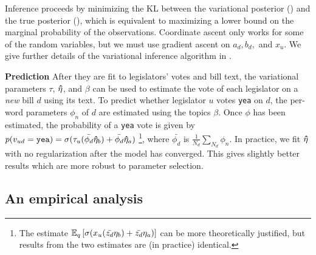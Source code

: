 Inference proceeds by minimizing the KL between the variational
posterior () and the true posterior (),
which is equivalent to maximizing a lower bound on the marginal
probability of the observations.  Coordinate ascent only works for
some of the random variables, but we must use gradient ascent on $a_d,
b_d,$ and $x_u$.  We give further details of the variational inference
algorithm in .

\textbf{Prediction} After they are fit to legislators' votes and bill
text, the variational parameters $\tau$, $\bm \hat \eta$, and $\beta$ can be
used to estimate the vote of each legislator on a \emph{new} bill $d$
using its text.  To predict whether legislator $u$ votes \verb!yea! on
$d$, the per-word parameters $\phi_n$ of $d$ are estimated using the
topics $\beta$. Once $\phi$ has been estimated, the probability of a
\verb!yea! vote is given by $p(v_{ud} = \verb!yea!)  = \sigma(\tau_u
(\bar{\phi_d} \ev_b) + \bar{\phi_d} \ev_a)$
\footnote{The estimate $\mathbb{E}_q\left[\sigma(x_u (\bar{z_d} \eta_b) +
    \bar{z_d} \eta_a)\right]$ can be more theoretically justified, but
  results from the two estimates are (in practice) identical.}, where
$\bar{\phi_d}$ is $\frac{1}{N_d} \sum_{N_d} \phi_n$.  In practice, we
fit $\bm \hat \eta$ with no regularization after the model has converged.  This
gives slightly better results which are more robust to parameter
selection.

\subsection*{An empirical analysis}

